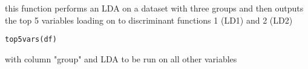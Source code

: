 \documentclass[a4paper]{book}
\begin{document}
%
\begin{Description}\relax
this function performs an LDA on a dataset with three groups and then outputs the top 5 variables loading on to discriminant functions 1 (LD1) and 2 (LD2)
\end{Description}
%
\begin{Usage}
\begin{verbatim}
top5vars(df)
\end{verbatim}
\end{Usage}
%
\begin{Arguments}
\begin{ldescription}
\item[\code{dataframe}] with column "group" and LDA to be run on all other variables
\end{ldescription}
\end{Arguments}
\printindex{}
\end{document}
